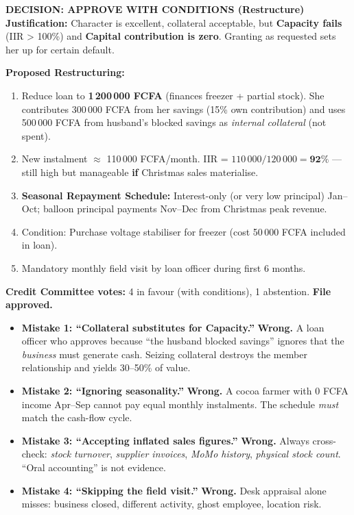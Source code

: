 \documentclass[11pt]{article}
\begin{document}
\begin{exoresolu}
\textbf{DECISION: \textcolor{poporange}{\textbf{APPROVE WITH CONDITIONS (Restructure)}}} \\
\textbf{Justification:} Character is excellent, collateral acceptable, but \textbf{Capacity fails} (IIR > 100\%) and \textbf{Capital contribution is zero}. Granting as requested sets her up for certain default.

\textbf{Proposed Restructuring:}
\begin{enumerate}
    \item Reduce loan to \textbf{1\,200\,000 FCFA} (finances freezer + partial stock). She contributes 300\,000 FCFA from her savings (15\% own contribution) and uses 500\,000 FCFA from husband's blocked savings as \emph{internal collateral} (not spent).
    \item New instalment $\approx$ 110\,000 FCFA/month. IIR = $110\,000 / 120\,000 = \mathbf{92\%}$ — still high but manageable \textbf{if} Christmas sales materialise.
    \item \textbf{Seasonal Repayment Schedule:} Interest-only (or very low principal) Jan--Oct; balloon principal payments Nov--Dec from Christmas peak revenue.
    \item Condition: Purchase voltage stabiliser for freezer (cost 50\,000 FCFA included in loan).
    \item Mandatory monthly field visit by loan officer during first 6 months.
\end{enumerate}
\textbf{Credit Committee votes:} 4 in favour (with conditions), 1 abstention. \textbf{File approved.}
\end{exoresolu}

\begin{attention}
\begin{itemize}
    \item \textbf{Mistake 1: ``Collateral substitutes for Capacity.''} \textbf{Wrong.} A loan officer who approves because ``the husband blocked savings'' ignores that the \emph{business} must generate cash. Seizing collateral destroys the member relationship and yields 30--50\% of value.
    \item \textbf{Mistake 2: ``Ignoring seasonality.''} \textbf{Wrong.} A cocoa farmer with 0 FCFA income Apr--Sep cannot pay equal monthly instalments. The schedule \emph{must} match the cash-flow cycle.
    \item \textbf{Mistake 3: ``Accepting inflated sales figures.''} \textbf{Wrong.} Always cross-check: \emph{stock turnover}, \emph{supplier invoices}, \emph{MoMo history}, \emph{physical stock count}. ``Oral accounting'' is not evidence.
    \item \textbf{Mistake 4: ``Skipping the field visit.''} \textbf{Wrong.} Desk appraisal alone misses: business closed, different activity, ghost employee, location risk.
\end{itemize}
\end{attention}
\end{document}
